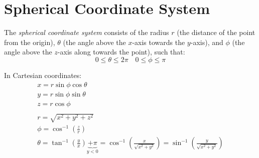 \documentclass[00_complete]{subfiles}
\begin{document}
\section{Spherical Coordinate System}

The \emph{spherical coordinate system} consists of the radius \(r\) (the
distance of the point from the origin), \(\theta\) (the angle above the
\(x\)-axis towards the \(y\)-axis), and \(\phi\) (the angle above the
\(z\)-axis along towards the point), such that:
\[
0 \leq \theta \leq 2 \pi \quad 0 \leq \phi \leq \pi
\]

In Cartesian coordinates:
\[
\begin{gathered}
    x = r \sin \phi \cos \theta \\
    y = r \sin \phi \sin \theta \\
    z = r \cos \phi \\
    \\
    r = \sqrt{x^2+y^2+z^2} \\
    \phi = \cos^{-1}\left(\frac{z}{r}\right) \\
    \theta = \tan^{-1}\left(\frac{y}{x}\right) \underbrace{+\pi}_{y<0}
    = \cos^{-1}\left(\frac{x}{\sqrt{x^2+y^2}}\right)
    = \sin^{-1}\left(\frac{y}{\sqrt{x^2+y^2}}\right)
\end{gathered}
\]
\end{document}
